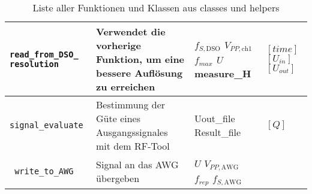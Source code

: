 \documentclass[../Report.tex]{subfiles}
\begin{document}
\begin{table}[H]
\begin{tabular}[t]{| >{\texttt\bgroup}m{3.5cm}<{\egroup}|m{8cm}|m{2cm}|m{2cm}|}
  \hline
  read\_from\_DSO\_ \newline resolution & Verwendet die vorherige Funktion, um eine bessere Auflösung zu erreichen & $f_{S,\textrm{DSO}}$ \newline $V_{PP,\textrm{ch1}}$ \newline $f_{max}$ \newline $U$ \newline measure\_H & $[time]$ \newline $[U_{in}]$ \newline $[U_{out}]$\\
  \hline
  signal\_evaluate & Bestimmung der Güte eines Ausgangssignales mit dem RF-Tool \cite{RF-Tool} & Uout\_file \newline Result\_file & $[Q]$\\
  \hline
  write\_to\_AWG & Signal an das AWG übergeben & $U$ \newline $V_{PP,\textrm{AWG}}$ $f_{rep}$ \newline $f_{S,\textrm{AWG}}$ &  \\
  \hline
\end{tabular}
\caption{Liste aller Funktionen und Klassen aus classes und helpers}
\label{tab:anhang.Funktionen.class.helpers}
\end{table}
\end{document}
